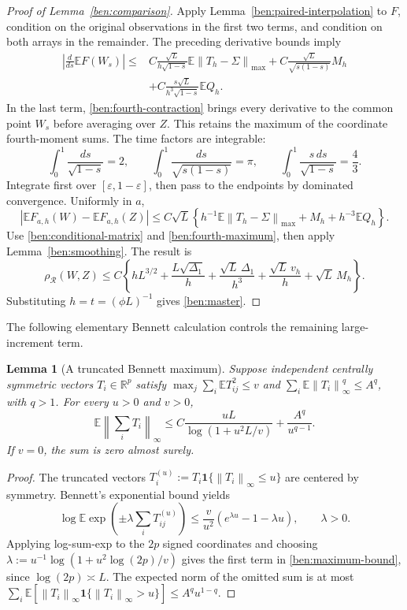\documentclass[11pt,letterpaper]{article}
\newenvironment{recovered}{\color{magenta}}{}
\newtheorem{lemma}{Lemma}
\theoremstyle{remark}
\newcommand{\E}{\mathbb E}
\newcommand{\R}{\mathbb R}
\newcommand{\norm}[1]{\left\lVert#1\right\rVert}
\newcommand{\rh}{\rho_{\mathcal R}}
\newcommand{\ind}{\mathbf 1}
\begin{document}
\begin{recovered}
\begin{proof}[Proof of Lemma~\ref{ben:comparison}]
Apply Lemma~\ref{ben:paired-interpolation} to \(F\), condition on
the original observations in the first two terms, and condition on
both arrays in the remainder. The preceding derivative bounds imply
\begin{align*}
 \left|\frac d{ds}\E F(W_s)\right|
 \le{}&C\frac{\sqrt L}{h\sqrt{1-s}}
                \E\norm{T_h-\Sigma}_{\max}
       +C\frac{\sqrt L}{\sqrt{s(1-s)}}M_h\\
 &+C\frac{s\sqrt L}{h^3\sqrt{1-s}}\E Q_h.
\end{align*}
In the last term, \eqref{ben:fourth-contraction} brings every
derivative to the common point \(W_s\) before averaging over \(Z\).
This retains the maximum of the coordinate fourth-moment sums.
The time factors are integrable:
\[
 \int_0^1\frac{ds}{\sqrt{1-s}}=2,\qquad
 \int_0^1\frac{ds}{\sqrt{s(1-s)}}=\pi,\qquad
 \int_0^1\frac{s\,ds}{\sqrt{1-s}}=\frac43.
\]
Integrate first over \([\varepsilon,1-\varepsilon]\), then pass
to the endpoints by dominated convergence. Uniformly in \(a\),
\[
 |\E F_{a,h}(W)-\E F_{a,h}(Z)|
 \le C\sqrt L\left\{
 h^{-1}\E\norm{T_h-\Sigma}_{\max}+M_h+h^{-3}\E Q_h\right\}.
\]
Use \eqref{ben:conditional-matrix} and \eqref{ben:fourth-maximum},
then apply Lemma~\ref{ben:smoothing}. The result is
\[
 \rh(W,Z)\le C\left\{
 hL^{3/2}+\frac{L\sqrt{\Delta_1}}h
 +\frac{\sqrt L\,\Delta_1}{h^3}
 +\frac{\sqrt L\,v_h}h+\sqrt L\,M_h\right\}.
\]
Substituting \(h=t=(\phi L)^{-1}\) gives \eqref{ben:master}.
\end{proof}
\end{recovered}


The following elementary Bennett calculation controls the remaining
large-increment term.

\begin{lemma}[A truncated Bennett maximum]\label{ben:maximum}
Suppose independent centrally symmetric vectors \(T_i\in\R^p\)
satisfy \(\max_j\sum_i\E T_{ij}^2\le v\) and
\(\sum_i\E\norm{T_i}_\infty^q\le A^q\), with \(q>1\).
For every \(u>0\) and \(v>0\),
\begin{equation}
 \E\norm{\sum_iT_i}_\infty
 \le C\frac{uL}{\log(1+u^2L/v)}+\frac{A^q}{u^{q-1}}.
 \label{ben:maximum-bound}
\end{equation}
If \(v=0\), the sum is zero almost surely.
\end{lemma}
\begin{proof}
The truncated vectors \(T_i^{(u)}:=T_i\ind\{\norm{T_i}_\infty\le u\}\)
are centered by symmetry. Bennett's exponential bound yields
\[
 \log\E\exp\left(\pm\lambda\sum_iT_{ij}^{(u)}\right)
 \le\frac v{u^2}(e^{\lambda u}-1-\lambda u),\qquad\lambda>0.
\]
Applying log-sum-exp to the \(2p\) signed coordinates and choosing
\(\lambda:=u^{-1}\log(1+u^2\log(2p)/v)\) gives the first term in
\eqref{ben:maximum-bound}, since \(\log(2p)\asymp L\).
The expected norm of the omitted sum is at most
\(\sum_i\E[\norm{T_i}_\infty\ind\{\norm{T_i}_\infty>u\}]
\le A^qu^{1-q}\).
\end{proof}
\end{document}

